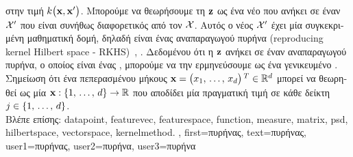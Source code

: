 {{{		στην τιμή $k\big({\bf x},{\bf x}'\big)$. Μπορούμε να θεωρήσουμε τη}  ${\bf z}$ \foreignlanguage{greek}{ως 
		ένα νέο}  \foreignlanguage{greek}{που ανήκει σε έναν}  $\mathcal{X}'$ 
		\foreignlanguage{greek}{που είναι συνήθως διαφορετικός από τον $\mathcal{X}$. Αυτός ο νέος}  $\mathcal{X}'$ 
		\foreignlanguage{greek}{έχει μία συγκεκριμένη μαθηματική δομή, δηλαδή είναι ένας}  
		\foreignlanguage{greek}{αναπαραγωγού πυρήνα} (reproducing kernel Hilbert space - RKHS)~\cite{LearningKernelsBook}, \cite{LampertNowKernel}.
     		\foreignlanguage{greek}{Δεδομένου ότι η ${\bf z}$ ανήκει σε έναν}  \foreignlanguage{greek}{αναπαραγωγού 
		πυρήνα, ο οποίος είναι ένας} , \foreignlanguage{greek}{μπορούμε να την ερμηνεύσουμε ως ένα γενικευμένο}
	 	. \foreignlanguage{greek}{Σημείωση ότι ένα}  \foreignlanguage{greek}{πεπερασμένου μήκους 
		${\bf x}=\big(x_{1}, \,\ldots, \,x_{d} \big)\,^{T} \in \mathbb{R}^{d}$ 
	 	μπορεί να θεωρηθεί ως μία}  ${\bf x}: \{1, \,\ldots, \,d\} \rightarrow \mathbb{R}$ 
	 	\foreignlanguage{greek}{που αποδίδει μία πραγματική τιμή σε κάθε δείκτη} $j \in \{1, \,\ldots, \,d\}$. 
		\\
          	\foreignlanguage{greek}{Βλέπε επίσης:} \gls{datapoint}, \gls{featurevec}, \gls{featurespace}, \gls{function}, \gls{measure}, \gls{matrix}, \gls{psd}, 
		\gls{hilbertspace}, \gls{vectorspace}, \gls{kernelmethod}. },
	first={\foreignlanguage{greek}{πυρήνας}},
	text={\foreignlanguage{greek}{πυρήνας}},
	user1={\foreignlanguage{greek}{πυρήνας}}, %
  	user2={\foreignlanguage{greek}{πυρήνα}}, %
	user3={\foreignlanguage{greek}{πυρήνα}} %
}

